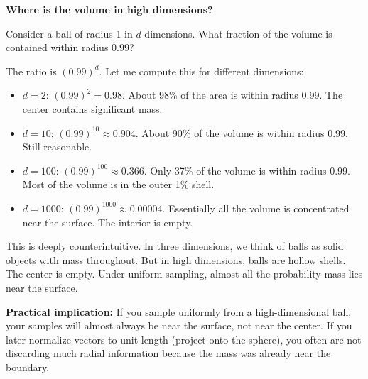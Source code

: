 \vspace{1.5em}

\begin{examplebox}
\textbf{Where is the volume in high dimensions?}

\vspace{0.5em}

Consider a ball of radius 1 in $d$ dimensions. What fraction of the volume is contained within radius $0.99$?

\vspace{0.5em}

The ratio is $(0.99)^d$. Let me compute this for different dimensions:

\begin{itemize}
\item $d = 2$: $(0.99)^2 = 0.98$. About 98\% of the area is within radius 0.99. The center contains significant mass.

\item $d = 10$: $(0.99)^{10} \approx 0.904$. About 90\% of the volume is within radius 0.99. Still reasonable.

\item $d = 100$: $(0.99)^{100} \approx 0.366$. Only 37\% of the volume is within radius 0.99. Most of the volume is in the outer 1\% shell.

\item $d = 1000$: $(0.99)^{1000} \approx 0.00004$. Essentially all the volume is concentrated near the surface. The interior is empty.
\end{itemize}

\vspace{0.5em}

This is deeply counterintuitive. In three dimensions, we think of balls as solid objects with mass throughout. But in high dimensions, balls are hollow shells. The center is empty. Under uniform sampling, almost all the probability mass lies near the surface.

\vspace{0.5em}

\textbf{Practical implication:} If you sample uniformly from a high-dimensional ball, your samples will almost always be near the surface, not near the center. If you later normalize vectors to unit length (project onto the sphere), you often are not discarding much radial information because the mass was already near the boundary.
\end{examplebox}

\vspace{1.5em}

